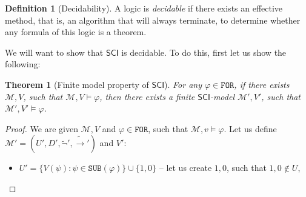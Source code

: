 \documentclass{article}
\newtheorem{theorem}{Theorem}
\theoremstyle{definition}
\newtheorem{definition}{Definition}[section]
\theoremstyle{definition}
\theoremstyle{definition}
\newcommand*{\ra}{\rightarrow}
\newcommand*{\FOR}{\texttt{FOR}}
\newcommand*{\SUB}{\texttt{SUB}}
\newcommand{\SCI}{$\mathsf{SCI}$\xspace}
\begin{document}
\begin{definition}[Decidability]
    A logic is \emph{decidable} if there exists an effective method, that is, an algorithm that will always terminate, to determine whether any formula of this logic is a theorem.
\end{definition}
%
We will want to show that \SCI is decidable. To do this, first let us show the
following:
\begin{theorem}[Finite model property of \SCI]
    \label{finite_model}
    For any $\varphi \in \FOR$, if there exists $\mathcal{M},V$, such that $\mathcal{M},V \models \varphi$, then there exists a finite \SCI-model $\mathcal{M'},V'$, such that $\mathcal{M'},V'\models \varphi$.
\end{theorem}
\begin{proof}
    We are given $\mathcal{M}, V$ and $\varphi \in \FOR$, such that $\mathcal{M}, v \models \varphi$. Let us define $\mathcal{M'} = (U', D', \tilde{\lnot}', \tilde{\ra}')$ and $V'$:
    \begin{itemize}
        \item $U' = \{V(\psi) : \psi \in \SUB(\varphi)\} \cup \{1, 0\}$ -- let us create $1, 0$, such that $1, 0 \not \in U$,


\end{itemize}
\end{proof}
\end{document}
